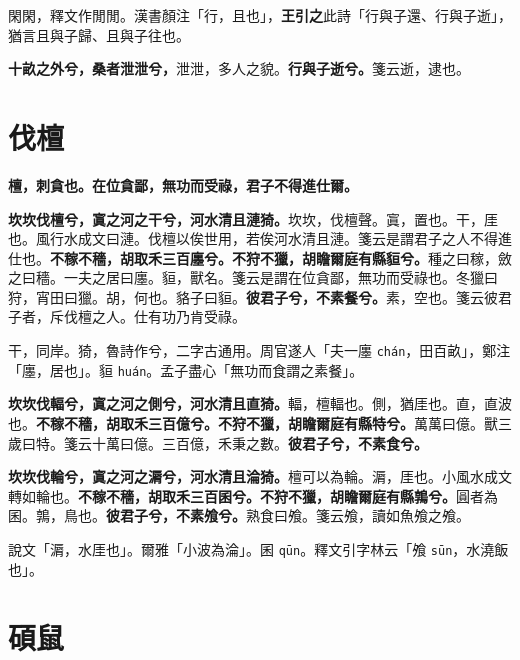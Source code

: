 \begin{quoting}閑閑，釋文作閒閒。漢書顏注「行，且也」，\textbf{王引之}此詩「行與子還、行與子逝」，猶言且與子歸、且與子往也。\end{quoting}

\textbf{十畝之外兮，桑者泄泄兮，}{\footnotesize 泄泄，多人之貌。}\textbf{行與子逝兮。}{\footnotesize 箋云逝，逮也。}

\section{伐檀}


\textbf{檀，刺貪也。在位貪鄙，無功而受祿，君子不得進仕爾。}

\textbf{坎坎伐檀兮，寘之河之干兮，河水清且漣猗。}{\footnotesize 坎坎，伐檀聲。寘，置也。干，厓也。風行水成文曰漣。伐檀以俟世用，若俟河水清且漣。箋云是謂君子之人不得進仕也。}\textbf{不稼不穡，胡取禾三百廛兮。不狩不獵，胡瞻爾庭有縣貆兮。}{\footnotesize 種之曰稼，斂之曰穡。一夫之居曰廛。貆，獸名。箋云是謂在位貪鄙，無功而受祿也。冬獵曰狩，宵田曰獵。胡，何也。貉子曰貆。}\textbf{彼君子兮，不素餐兮。}{\footnotesize 素，空也。箋云彼君子者，斥伐檀之人。仕有功乃肯受祿。}

\begin{quoting}干，同岸。猗，魯詩作兮，二字古通用。周官遂人「夫一廛 \texttt{chán}，田百畝」，鄭注「廛，居也」。貆 \texttt{huán}。孟子盡心「無功而食謂之素餐」。\end{quoting}

\textbf{坎坎伐輻兮，寘之河之側兮，河水清且直猗。}{\footnotesize 輻，檀輻也。側，猶厓也。直，直波也。}\textbf{不稼不穡，胡取禾三百億兮。不狩不獵，胡瞻爾庭有縣特兮。}{\footnotesize 萬萬曰億。獸三歲曰特。箋云十萬曰億。三百億，禾秉之數。}\textbf{彼君子兮，不素食兮。}

\textbf{坎坎伐輪兮，寘之河之漘兮，河水清且淪猗。}{\footnotesize 檀可以為輪。漘，厓也。小風水成文轉如輪也。}\textbf{不稼不穡，胡取禾三百囷兮。不狩不獵，胡瞻爾庭有縣鶉兮。}{\footnotesize 圓者為囷。鶉，鳥也。}\textbf{彼君子兮，不素飧兮。}{\footnotesize 熟食曰飧。箋云飧，讀如魚飧之飧。}

\begin{quoting}說文「漘，水厓也」。爾雅「小波為淪」。囷 \texttt{qūn}。釋文引字林云「飧 \texttt{sūn}，水澆飯也」。\end{quoting}

\section{碩鼠}

